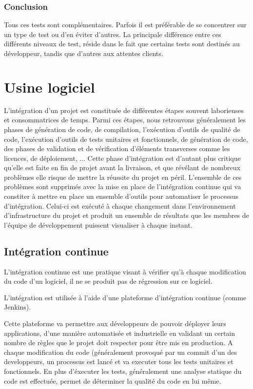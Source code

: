\subsubsection{Conclusion}

Tous ces tests sont complémentaires. Parfois il est préférable de se concentrer sur un type de test ou d'en éviter d'autres.
La principale différence entre ces différents niveaux de test, réside dans le fait que certains tests sont destinés au développeur, tandis que d'autres aux attentes clients. 

\section{Usine logiciel}
L'intégration d'un projet est constituée de différentes étapes souvent laborieuses et consommatrices de temps. Parmi ces étapes, nous retrouvons généralement les phases de génération de code, de compilation, l'exécution d'outils de qualité de code, l'exécution d'outils de tests unitaires et fonctionnels, de génération de code, des phases de validation et de vérification d'éléments transverses comme les licences, de déploiement, ...
\jumpOne
Cette phase d'intégration est d'autant plus critique qu'elle est faite en fin de projet avant la livraison, et que révélant de nombreux problèmes elle risque de mettre la réussite du projet en péril.
\jumpOne
L'ensemble de ces problèmes sont supprimés avec la mise en place de l'intégration continue qui va constiter à mettre en place un ensemble d'outils pour automatiser le processus d'intégration. Celui-ci est exécuté à chaque changement dans l'environnement d'infrastructure du projet et produit un ensemble de résultats que les membres de l'équipe de développement puissent visualiser à chaque instant.

\subsection{Intégration continue}
L'intégration continue est une pratique visant à vérifier qu'à chaque modification du code d'un logiciel, il ne se produit pas de régression sur ce logiciel. 

L'intégration est utilisée à l'aide d'une plateforme d'intégration continue (comme Jenkins).

Cette plateforme va permettre aux développeurs de pouvoir déployer leurs applications, d'une manière automatisée et industrielle en validant un certain nombre de règles que le projet doit respecter pour être mis en production.
\jumpOne
A chaque modification du code (généralement provoqué par un \gls{commit}
d'un des developpeurs, un processus est lancé et va executer tous les tests unitaires et fonctionnels. 
En plus d'éxecuter les tests, généralement une analyse statique du code est effectuée, permet de déterminer la qualité du code en lui même. 

